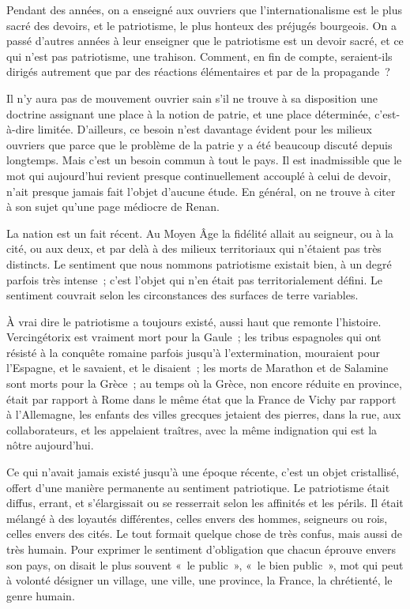 \documentclass[french,twoside]{book} %
\begin{document}
Pendant des années, on a enseigné aux ouvriers que l'internationalisme est le plus sacré des devoirs, et le patriotisme, le plus honteux des préjugés bourgeois. On a passé d'autres années à leur enseigner que le patriotisme est un devoir sacré, et ce qui n'est pas patriotisme, une trahison. Comment, en fin de compte, seraient-ils dirigés autrement que par des réactions élémentaires et par de la propagande ?\par
Il n'y aura pas de mouvement ouvrier sain s'il ne trouve à sa disposition une doctrine assignant une place à la notion de patrie, et une place déterminée, c'est-à-dire limitée. D'ailleurs, ce besoin n'est davantage évident pour les milieux ouvriers que parce que le problème de la patrie y a été beaucoup discuté depuis longtemps. Mais c'est un besoin commun à tout le pays. Il est inadmissible que le mot qui aujourd'hui revient presque continuellement accouplé à celui de devoir, n'ait presque jamais fait l'objet d'aucune étude. En général, on ne trouve à citer à son sujet qu'une page médiocre de Renan.\par
La nation est un fait récent. Au Moyen Âge la fidélité allait au seigneur, ou à la cité, ou aux deux, et par delà à des milieux territoriaux qui n'étaient pas très distincts. Le sentiment que nous nommons patriotisme existait bien, à un degré parfois très intense ; c'est l'objet qui n'en était pas territorialement défini. Le sentiment couvrait selon les circonstances des surfaces de terre variables.\par
À vrai dire le patriotisme a toujours existé, aussi haut que remonte l'histoire. Vercingétorix est vraiment mort pour la Gaule ; les tribus espagnoles qui ont résisté à la conquête romaine parfois jusqu'à l'extermination, mouraient pour l'Espagne, et le savaient, et le disaient ; les morts de Marathon et de Salamine sont morts pour la Grèce ; au temps où la Grèce, non encore réduite en province, était par rapport à Rome dans le même état que la France de Vichy par rapport à l'Allemagne, les enfants des villes grecques jetaient des pierres, dans la rue, aux collaborateurs, et les appelaient traîtres, avec la même indignation qui est la nôtre aujourd'hui.\par
Ce qui n'avait jamais existé jusqu'à une époque récente, c'est un objet cristallisé, offert d'une manière permanente au sentiment patriotique. Le patriotisme était diffus, errant, et s'élargissait ou se resserrait selon les affinités et les périls. Il était mélangé à des loyautés différentes, celles envers des hommes, seigneurs ou rois, celles envers des cités. Le tout formait quelque chose de très confus, mais aussi de très humain. Pour exprimer le sentiment d'obligation que chacun éprouve envers son pays, on disait le plus souvent « le public », « le bien public », mot qui peut à volonté désigner un village, une ville, une province, la France, la chrétienté, le genre humain.\par
\end{document}
